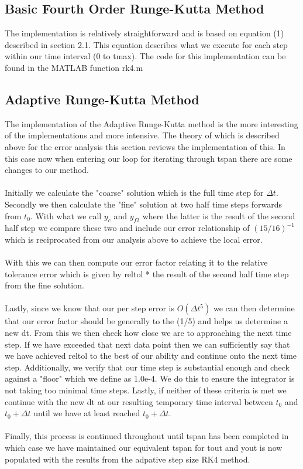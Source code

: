 \documentclass{article}
\begin{document}
\subsection{Basic Fourth Order Runge-Kutta Method}
The implementation is relatively straightforward and is based on equation (1) described in section 2.1. This equation describes what we execute for each step within our time interval (0 to tmax). The code for this implementation can be found in the MATLAB function rk4.m

\subsection{Adaptive Runge-Kutta Method}
The implementation of the Adaptive Runge-Kutta method is the more interesting of the implementations and more intensive. The theory of which is described above for the error analysis this section reviews the implementation of this. In this case now when entering our loop for iterating through tspan there are some changes to our method.\\
\\
Initially we calculate the "coarse" solution which is the full time step for $\Delta t$. Secondly we then calculate the "fine" solution at two half time steps forwards from $t_0$. With what we call $y_c$ and $y_{f2}$ where the latter is the result of the second half step we compare these two and include our error relationship of $(15/16)^{-1}$ which is reciprocated from our analysis above to achieve the local error.\\
\\
With this we can then compute our error factor relating it to the relative tolerance error which is given by reltol * the result of the second half time step from the fine solution.\\
\\
Lastly, since we know that our per step error is $O(\Delta t^5)$ we can then determine that our error factor should be generally to the (1/5) and helps us determine a new dt. From this we then check how close we are to approaching the next time step. If we have exceeded that next data point then we can sufficiently say that we have achieved reltol to the best of our ability and continue onto the next time step. Additionally, we verify that our time step is substantial enough and check against a "floor" which we define as 1.0e-4. We do this to ensure the integrator is not taking too minimal time steps. Lastly, if neither of these criteria is met we continue with the new dt at our resulting temporary time interval between $t_0$ and $t_0 + \Delta t$ until we have at least reached $t_0 + \Delta t$.\\
\\
Finally, this process is continued throughout until tspan has been completed in which case we have maintained our equivalent tspan for tout and yout is now populated with the results from the adpative step size RK4 method.
\end{document}

